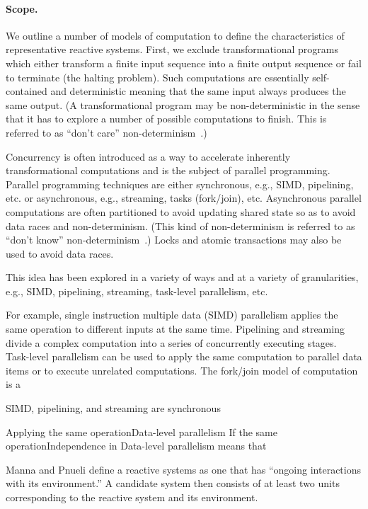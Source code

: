 \documentclass[letterpaper]{article}
\begin{document}
\paragraph{Scope.}
We outline a number of models of computation to define the characteristics of representative reactive systems.
First, we exclude transformational programs which either transform a finite input sequence into a finite output sequence or fail to terminate (the halting problem).
Such computations are essentially self-contained and deterministic meaning that the same input always produces the same output.
(A transformational program may be non-deterministic in the sense that it has to explore a number of possible computations to finish.
This is referred to as ``don't care'' non-determinism~\cite{atomic_transactions}.)

Concurrency is often introduced as a way to accelerate inherently transformational computations and is the subject of parallel programming.
Parallel programming techniques are either synchronous, e.g., SIMD, pipelining, etc. or asynchronous, e.g., streaming, tasks (fork/join), etc.
Asynchronous parallel computations are often partitioned to avoid updating shared state so as to avoid data races and non-determinism.
(This kind of non-determinism is referred to as ``don't know'' non-determinism~\cite{atomic_transactions}.)
Locks and atomic transactions may also be used to avoid data races.






This idea has been explored in a variety of ways and at a variety of granularities, e.g., SIMD, pipelining, streaming, task-level parallelism, etc.

For example, single instruction multiple data (SIMD) parallelism applies the same operation to different inputs at the same time.
Pipelining and streaming divide a complex computation into a series of concurrently executing stages.
Task-level parallelism can be used to apply the same computation to parallel data items or to execute unrelated computations.
The fork/join model of computation is a 

SIMD, pipelining, and streaming are synchronous 

Applying the same operationData-level parallelism If the same operationIndependence in Data-level parallelism means that 







Manna and Pnueli define a reactive systems as one that has ``ongoing interactions with its environment.''
A candidate system then consists of at least two units corresponding to the reactive system and its environment.
\end{document}
